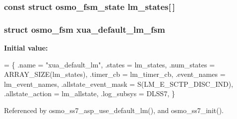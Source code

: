 \subsubsection[{lm\+\_\+states}]{\setlength{\rightskip}{0pt plus 5cm}const struct osmo\+\_\+fsm\+\_\+state lm\+\_\+states[$\,$]\hspace{0.3cm}{\ttfamily [static]}}\label{xua__default__lm__fsm_8c_a57c9b8d5dc3d987500e141df6154a822}
\subsubsection[{xua\+\_\+default\+\_\+lm\+\_\+fsm}]{\setlength{\rightskip}{0pt plus 5cm}struct osmo\+\_\+fsm xua\+\_\+default\+\_\+lm\+\_\+fsm}\label{xua__default__lm__fsm_8c_a6440967ba56751bd7b6913c0bc6402e9}
{\bfseries Initial value\+:}
\begin{DoxyCode}
= \{
        .name = \textcolor{stringliteral}{"xua\_default\_lm"},
        .states = lm_states,
        .num\_states = ARRAY\_SIZE(lm_states),
        .timer\_cb = lm_timer_cb,
        .event\_names = lm_event_names,
        .allstate\_event\_mask = S(LM_E_SCTP_DISC_IND),
        .allstate\_action = lm_allstate,
        .log\_subsys = DLSS7,
\}
\end{DoxyCode}


Referenced by osmo\+\_\+ss7\+\_\+asp\+\_\+use\+\_\+default\+\_\+lm(), and osmo\+\_\+ss7\+\_\+init().


